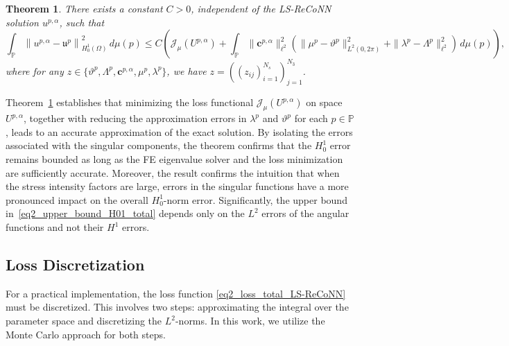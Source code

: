 \documentclass[oneside]{article}
\newtheorem{theorem}{Theorem}[section]
\begin{document}
\begin{theorem}\label{Theorem_main}
There exists a constant $C > 0$, independent of the LS-ReCoNN solution $u^{p, \alpha}$, such that
\begin{equation}\label{eq2_upper_bound_H01_total}
\int_{\mathbb{P}} \left\| u^{p, \alpha} - \mathfrak{u}^p \right\|_{H_0^1(\Omega)}^2 \, d\mu(p)
\leq C \left( \mathcal{J}_\mu(U^{p, \alpha})
+ \int_{\mathbb{P}} \| \mathbf{c}^{p, \alpha}\|_{\ell ^2}^2 \left( \| \mu^p - \vartheta ^p \|_{L^2(0, 2\pi)}^2 + \| \lambda^p - \Lambda^p \|_{\ell ^2}^2 \right)\, d\mu(p) \right) ,
\end{equation}
where for any $z \in\{ \vartheta^p, \Lambda^p,\mathbf{c}^{p, \alpha}, \mu^p,  \lambda^p\} $, we have  $z = \left((z_{ij})_{i=1}^{N_s}\right)_{j=1}^{N_3}$.
\end{theorem}


\noindent Theorem~\ref{Theorem_main} establishes that minimizing the loss functional \( \mathcal{J}_\mu(U^{p, \alpha}) \) on space \( U^{p, \alpha} \), together with reducing the approximation errors in \( \lambda^p \) and \( \vartheta^p \) for each $p \in \mathbb{P}$, leads to an accurate approximation of the exact solution. By isolating the errors associated with the singular components, the theorem confirms that the $H^1_0$ error remains bounded as long as the FE eigenvalue solver and the loss minimization are sufficiently accurate. Moreover, the result confirms the intuition that when the stress intensity factors are large, errors in the singular functions have a more pronounced impact on the overall \( H^1_0 \)-norm error. Significantly, the upper bound in~\eqref{eq2_upper_bound_H01_total} depends only on the $L^2$ errors of the angular functions and not their $H^1$ errors.





\subsection{Loss Discretization}\label{Loss Discretization}
\noindent For a practical implementation, the loss function \eqref{eq2_loss_total_LS-ReCoNN} must be discretized. This involves two steps: approximating the integral over the parameter space and discretizing the $L^2$-norms. In this work, we utilize the Monte Carlo approach for both steps.
\end{document}
